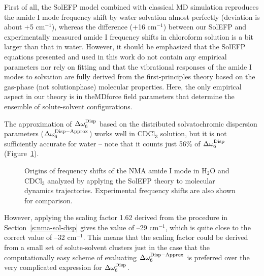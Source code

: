 \documentclass[a4paper,titlepage,twoside,fleqn,12pt]{book}
\begin{document}
\begin{refsection}
First of all, the SolEFP model combined with classical
MD simulation reproduces the amide I mode frequency
shift by water solvation almost perfectly (deviation is about
+5 cm$^{-1}$), whereas the difference (+16 cm$^{-1}$) between our
SolEFP and experimentally measured amide I frequency shifts
in chloroform solution is a bit larger than that in water.
However, it should be emphasized that the SolEFP equations
presented and used in this work do not contain any empirical
parameters nor rely on fitting and that the vibrational responses
of the amide I modes to solvation are fully derived from the
first\hyp{}principles theory based on the gas\hyp{}phase (not solutionphase)
molecular properties. Here, the only empirical aspect
in our theory is in theMDforce field parameters that determine
the ensemble of solute\hyp{}solvent configurations.

The approximation of $\Delta\omega^{\rm Disp}_6$
based on the distributed
solvatochromic dispersion parameters ($\Delta\omega^{\rm Disp-Approx}_6$)
works
well in CDCl$_3$ solution, but it is not sufficiently accurate for
water -- note that it counts just 56\% of $\Delta\omega^{\rm Disp}_6$
(Figure~\ref{f:nma-solefp-md}).
%
\begin{figure}[t!]
\centering
\setlength\fboxsep{0.4pt}
\setlength\fboxrule{0.5pt}
\caption{
Origins of frequency shifts of the NMA amide I mode 
in H$_2$O and CDCl$_3$ analyzed by applying 
the SolEFP theory to molecular dynamics trajectories. 
Experimental frequency shifts are also shown for comparison.
\label{f:nma-solefp-md}}
\end{figure}
%
However, applying the scaling factor 1.62 derived from the
procedure in Section~\ref{s:nma-sol-disp} 
gives the value of --29 cm$^{-1}$, which
is quite close to the correct value of --32 cm$^{-1}$. This means
that the scaling factor could be derived from a small set of
solute\hyp{}solvent clusters just in the case that the computationally
easy scheme of evaluating $\Delta\omega^{\rm Disp-Approx}_6$ is preferred over the very
complicated expression for $\Delta\omega^{\rm Disp}_6$.


\end{refsection}
\end{document}
